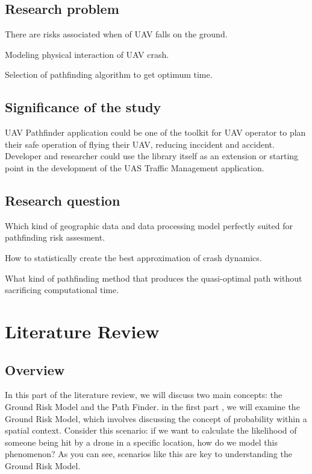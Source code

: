 \documentclass[12pt]{report}
\begin{document}
    \section{Research problem}
        \begin{myitemize}
            \item There are risks associated when of UAV falls on the ground.
            \item Modeling physical interaction of UAV crash.
            \item Selection of pathfinding algorithm to get optimum time.
        \end{myitemize}
        
    \section{Significance of the study}
        UAV Pathfinder application could be one of the toolkit for UAV operator to plan their safe operation of
        flying their UAV, reducing inccident and accident. Developer and researcher could use the library itself as an
        extension or starting point in the development of the \ac{UAS} Traffic Management application.
        
    \section{Research question}
        \begin{myitemize}
            \item Which kind of geographic data and data processing model perfectly suited for pathfinding risk assesment.  
            \item How to statistically create the best approximation of crash dynamics.
            \item What kind of pathfinding method that produces the quasi-optimal path without sacrificing computational time.
        \end{myitemize}



\chapter{Literature Review}
    \section{Overview}
        In this part of the literature review, we will discuss two main concepts: the Ground Risk Model and the Path
        Finder. in the first part , we will examine the Ground Risk Model, which involves discussing the concept of
        probability within a spatial context. Consider this scenario: if we want to calculate the likelihood of someone
        being hit by a drone in a specific location, how do we model this phenomenon? As you can see, scenarios like
        this are key to understanding the Ground Risk Model.
\end{document}
